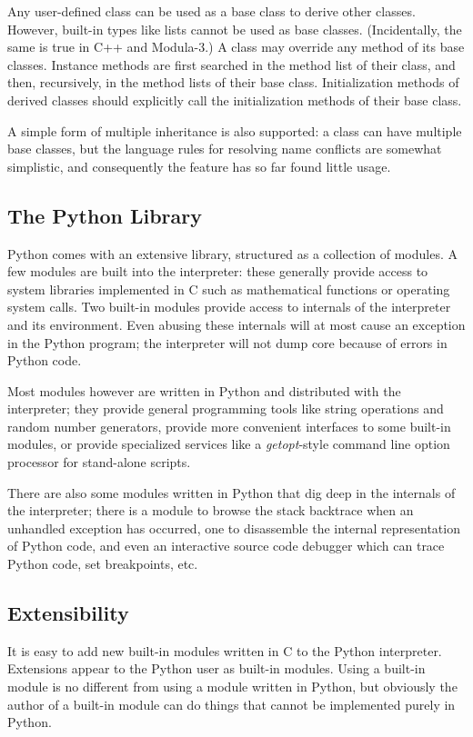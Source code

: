 Any user-defined class can be used as a base class to derive other
classes.  However, built-in types like lists cannot be used as base
classes.  (Incidentally, the same is true in C++ and Modula-3.)  A
class may override any method of its base classes.  Instance methods
are first searched in the method list of their class, and then,
recursively, in the method lists of their base class.  Initialization
methods of derived classes should explicitly call the initialization
methods of their base class.

A simple form of multiple inheritance is also supported: a class can
have multiple base classes, but the language rules for resolving name
conflicts are somewhat simplistic, and consequently the feature has so
far found little usage.

\subsection{The Python Library}

Python comes with an extensive library, structured as a collection of
modules.  A few modules are built into the interpreter: these
generally provide access to system libraries implemented in C such as
mathematical functions or operating system calls.  Two built-in
modules provide access to internals of the interpreter and its
environment.  Even abusing these internals will at most cause an
exception in the Python program; the interpreter will not dump core
because of errors in Python code.

Most modules however are written in Python and distributed with the
interpreter; they provide general programming tools like string
operations and random number generators, provide more convenient
interfaces to some built-in modules, or provide specialized services
like a {\em getopt}-style command line option processor for
stand-alone scripts.

There are also some modules written in Python that dig deep in the
internals of the interpreter; there is a module to browse the stack
backtrace when an unhandled exception has occurred, one to disassemble
the internal representation of Python code, and even an interactive
source code debugger which can trace Python code, set breakpoints,
etc.

\subsection{Extensibility}

It is easy to add new built-in modules written in C to the Python
interpreter.  Extensions appear to the Python user as built-in
modules.  Using a built-in module is no different from using a module
written in Python, but obviously the author of a built-in module can
do things that cannot be implemented purely in Python.

